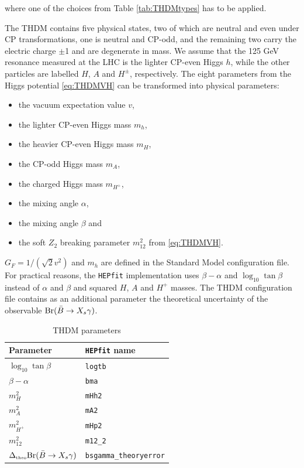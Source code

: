 \documentclass[preprint,3p,12pt]{elsarticle}
\newcommand{\HEPfit}{\texttt{HEPfit}\xspace}
\begin{document}
where one of the choices from Table \ref{tab:THDMtypes} has to be applied.

The THDM contains five physical states, two of which are neutral and even under CP transformations, one is neutral and CP-odd, and the remaining two carry the electric charge $\pm$1 and are degenerate in mass. We assume that the 125 GeV resonance measured at the LHC is the lighter CP-even Higgs $h$, while the other particles are labelled $H$, $A$ and $H^\pm$, respectively.
The eight parameters from the Higgs potential \eqref{eq:THDMVH} can be transformed into physical parameters:

\begin{itemize}
\item the vacuum expectation value $v$,
\item the lighter CP-even Higgs mass $m_h$,
\item the heavier CP-even Higgs mass $m_H$,
\item the CP-odd Higgs mass $m_A$,
\item the charged Higgs mass $m_{H^+}$,
\item the mixing angle $\alpha$,
\item the mixing angle $\beta$ and
\item the soft $Z_2$ breaking parameter $m_{12}^2$ from \eqref{eq:THDMVH}.
\end{itemize}

$G_F=1/(\sqrt{2} v^2)$ and $m_h$ are defined in the Standard Model configuration file. For practical reasons, the \HEPfit implementation uses $\beta-\alpha$ and $\log_{10}\tan\beta$ instead of $\alpha$ and $\beta$ and squared $H$, $A$ and $H^+$ masses. The THDM configuration file contains as an additional parameter the theoretical uncertainty of the observable ${\rm Br}(\bar{B}\to X_s\gamma)$.

\begin{table}[tb]
 \centering
 \caption{THDM parameters}\vspace{0.2cm}
  \begin{tabular}{|l|l|}
    \hline
      \textbf{Parameter} & \textbf{\HEPfit name} \\
    \hline
      $\log_{10}\tan\beta$ & \tt{logtb}\\
    \hline
      $\beta-\alpha$ & \tt{bma}\\
    \hline
      $m_H^2$ & \tt{mHh2}\\
    \hline
      $m_A^2$ & \tt{mA2}\\
    \hline
      $m_{H^+}^2$ & \tt{mHp2}\\
    \hline
      $m_{12}^2$ & \tt{m12\_2}\\
    \hline
      $\Delta _{\text{\tiny{theo}}}{\rm Br}(\bar{B}\to X_s\gamma)$ & \tt{bsgamma\_theoryerror}\\
    \hline
  \end{tabular}
 \label{tab:HandAsearchlimits}
\end{table} 
\end{document}
